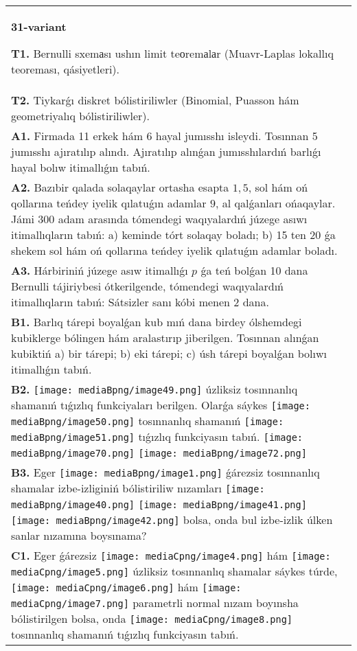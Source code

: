 \documentclass{article}
\begin{document}
\begin{tabular}{m{17cm}}
\textbf{31-variant}
\newline

\textbf{T1.} Bernulli sxemаsı ushın limit teоremаlаr (Muavr-Laplas lokallıq teoreması, qásiyetleri).
 \\
\textbf{T2.} Tiykarǵı diskret bólistiriliwler (Binomial, Puasson hám geometriyalıq bólistiriliwler).
 \\
\textbf{A1.} Firmada 11 erkek hám 6 hayal jumısshı isleydi. Tosınnan 5 jumısshı ajıratılıp alındı. Ajıratılıp alınǵan jumısshılardıń barlıǵı hayal bolıw itimallıǵın tabıń.
 \\
\textbf{A2.} Bazıbir qalada solaqaylar ortasha esapta $1,5$, sol hám oń qollarına teńdey iyelik qılatuǵın adamlar $9$, al qalǵanları ońaqaylar. Jámi 300 adam arasında tómendegi waqıyalardıń júzege asıwı itimallıqların tabıń: a) keminde tórt solaqay boladı; b) 15 ten 20 ǵa shekem sol hám oń qollarına teńdey iyelik qılatuǵın adamlar boladı.
 \\
\textbf{A3.} Hárbiriniń júzege asıw itimallıǵı $p$ ǵa teń bolǵan 10 dana Bernulli tájiriybesi ótkerilgende, tómendegi waqıyalardıń itimallıqların tabıń: Sátsizler sanı kóbi menen 2 dana.
 \\
\textbf{B1.} Barlıq tárepi boyalǵan kub mıń dana birdey ólshemdegi kubiklerge bólingen hám aralastırıp jiberilgen. Tosınnan alınǵan kubiktiń a) bir tárepi; b) eki tárepi; c) úsh tárepi boyalǵan bolıwı itimallıǵın tabıń.
 \\
\textbf{B2.} \texttt{[image: mediaBpng/image49.png]} úzliksiz tosınnanlıq shamanıń tıǵızlıq funkciyaları berilgen. Olarǵa sáykes \texttt{[image: mediaBpng/image50.png]} tosınnanlıq shamanıń \texttt{[image: mediaBpng/image51.png]} tıǵızlıq funkciyasın tabıń. \texttt{[image: mediaBpng/image70.png]} \texttt{[image: mediaBpng/image72.png]}
 \\
\textbf{B3.} Eger \texttt{[image: mediaBpng/image1.png]} ǵárezsiz tosınnanlıq shamalar izbe-izliginiń bólistiriliw nızamları
\texttt{[image: mediaBpng/image40.png]} \texttt{[image: mediaBpng/image41.png]} \texttt{[image: mediaBpng/image42.png]}
bolsa, onda bul izbe-izlik úlken sanlar nızamına boysınama?
 \\
\textbf{C1.} Eger ǵárezsiz \texttt{[image: mediaCpng/image4.png]} hám \texttt{[image: mediaCpng/image5.png]} úzliksiz tosınnanlıq shamalar sáykes túrde, \texttt{[image: mediaCpng/image6.png]} hám \texttt{[image: mediaCpng/image7.png]} parametrli normal nızam boyınsha bólistirilgen bolsa, onda \texttt{[image: mediaCpng/image8.png]} tosınnanlıq shamanıń tıǵızlıq funkciyasın tabıń.

\end{tabular}
\end{document}
